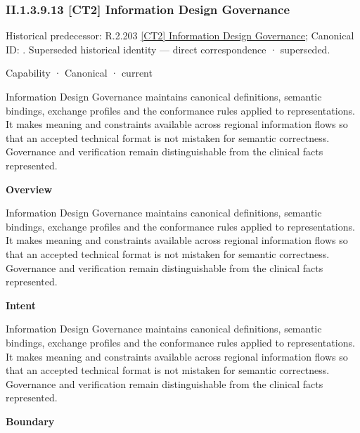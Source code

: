\subsubsection*{II.1.3.9.13 [CT2] Information Design Governance}
\label{navigation:II.1.3.9.13}

{\small Historical predecessor: R.2.203 \hyperref[element:0bdd7f8c0cd74d9fabc49801af037fc2]{[CT2] Information Design Governance}; Canonical ID: \texttt{}. Superseded historical identity — direct correspondence · superseded.}\par
\label{element:f39ed9ebcc724857a4bf7a2b8e045c7a}
{\small Capability · Canonical · current}\par

Information Design Governance maintains canonical definitions, semantic bindings, exchange profiles and the conformance rules applied to representations. It makes meaning and constraints available across regional information flows so that an accepted technical format is not mistaken for semantic correctness. Governance and verification remain distinguishable from the clinical facts represented.



\textbf{Overview}



Information Design Governance maintains canonical definitions, semantic bindings, exchange profiles and the conformance rules applied to representations. It makes meaning and constraints available across regional information flows so that an accepted technical format is not mistaken for semantic correctness. Governance and verification remain distinguishable from the clinical facts represented.



\textbf{Intent}



Information Design Governance maintains canonical definitions, semantic bindings, exchange profiles and the conformance rules applied to representations. It makes meaning and constraints available across regional information flows so that an accepted technical format is not mistaken for semantic correctness. Governance and verification remain distinguishable from the clinical facts represented.



\textbf{Boundary}



